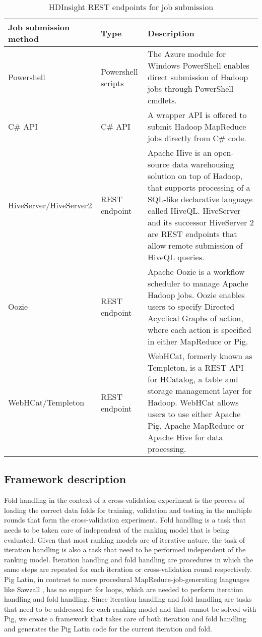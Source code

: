\begin{table}
\centering
\begin{tabular}{p{4.2cm}p{2.6cm}p{5.5cm}}\toprule
Job submission method & Type & Description \\
\midrule
Powershell & Powershell scripts & The Azure module for Windows PowerShell enables direct submission of Hadoop jobs through PowerShell cmdlets.\\
C\# API & C\# API & A wrapper API is offered to submit Hadoop MapReduce jobs directly from C\# code.\\
HiveServer/HiveServer2 & REST endpoint & Apache Hive \cite{Thusoo2009} is an open-source data warehousing solution on top of Hadoop, that supports processing of a SQL-like declarative language called HiveQL. HiveServer and its successor HiveServer 2 are REST endpoints that allow remote submission of HiveQL queries.\\
Oozie & REST endpoint & Apache Oozie \cite{Islam2012} is a workflow scheduler to manage Apache Hadoop jobs. Oozie enables users to specify Directed Acyclical Graphs of action, where each action is specified in either MapReduce or Pig.\\
WebHCat/Templeton & REST endpoint & WebHCat, formerly known as Templeton, is a REST API for HCatalog, a table and storage management layer for Hadoop. WebHCat allows users to use either Apache Pig, Apache MapReduce or Apache Hive for data processing.\\	
\bottomrule
\end{tabular}
\caption{HDInsight REST endpoints for job submission}
\label{tbl:hdinsight_endpoints}
\end{table}

\subsection{Framework description}
Fold handling in the context of a cross-validation experiment is the process of loading the correct data folds for training, validation and testing in the multiple rounds that form the cross-validation experiment. Fold handling is a task that needs to be taken care of independent of the ranking model that is being evaluated. Given that most ranking models are of iterative nature, the task of iteration handling is also a task that need to be performed independent of the ranking model. Iteration handling and fold handling are procedures in which the same steps are repeated for each iteration or cross-validation round respectively. Pig Latin, in contrast to more procedural MapReduce-job-generating languages like Sawzall \cite{Pike2005}, has no support for loops, which are needed to perform iteration handling and fold handling. Since iteration handling and fold handling are tasks that need to be addressed for each ranking model and that cannot be solved with Pig, we create a framework that takes care of both iteration and fold handling and generates the Pig Latin code for the current iteration and fold.\\

